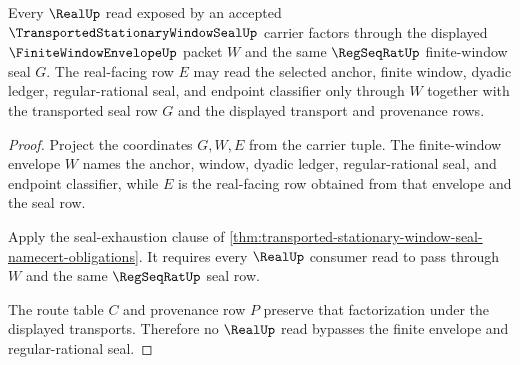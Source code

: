\begin{theorem}
\label{thm:transported-stationary-window-seal-real-factorization}
Every $\RealUp$ read exposed by an accepted $\TransportedStationaryWindowSealUp$ carrier factors through the displayed $\FiniteWindowEnvelopeUp$ packet $W$ and the same $\RegSeqRatUp$ finite-window seal $G$. The real-facing row $E$ may read the selected anchor, finite window, dyadic ledger, regular-rational seal, and endpoint classifier only through $W$ together with the transported seal row $G$ and the displayed transport and provenance rows.
\end{theorem}
\begin{proof}
Project the coordinates $G,W,E$ from the carrier tuple. The finite-window envelope $W$ names the anchor, window, dyadic ledger, regular-rational seal, and endpoint classifier, while $E$ is the real-facing row obtained from that envelope and the seal row.

Apply the seal-exhaustion clause of \autoref{thm:transported-stationary-window-seal-namecert-obligations}. It requires every $\RealUp$ consumer read to pass through $W$ and the same $\RegSeqRatUp$ seal row.

The route table $C$ and provenance row $P$ preserve that factorization under the displayed transports. Therefore no $\RealUp$ read bypasses the finite envelope and regular-rational seal.
\end{proof}

